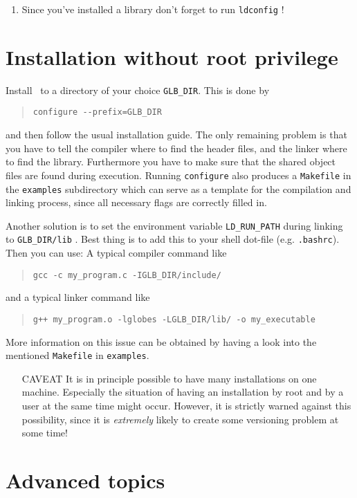 \begin{appendix}
\begin{enumerate}
\item Since you've installed a library don't forget to run \verb+ldconfig+ !
\end{enumerate}
\section*{Installation without root privilege}

Install \GLOBES\ to a directory of your choice \verb+GLB_DIR+. This is done by
\begin{quote}
\verb+configure --prefix=GLB_DIR+
\end{quote}
and then follow the usual installation guide. The only remaining problem
is that you have to tell the compiler where to find the header files, and 
the linker where to find the library. Furthermore you have to make sure 
that the shared object files are found during execution. Running 
\verb+configure+
also produces a \verb+Makefile+ in the \verb+examples+ 
subdirectory which can serve as
a template for the compilation and linking process, since all necessary
flags are correctly filled in. 

Another solution is to set the environment variable \verb+LD_RUN_PATH+
during linking to \verb+GLB_DIR/lib+ . Best thing is to add this to your
shell dot-file (e.g. \verb+.bashrc+). Then you can use:
A typical compiler command like
\begin{quote}
\verb+gcc -c my_program.c -IGLB_DIR/include/+
\end{quote}
and a typical linker command like
\begin{quote}
\verb#g++ my_program.o -lglobes -LGLB_DIR/lib/ -o my_executable#
\end{quote}
More information on this issue can be obtained by having a look 
into the mentioned  \verb+Makefile+ in \verb+examples+. 

\begin{itemize}
\item[CAVEAT] It is in principle possible to have many installations 
on one machine. Especially the situation of having an installation by root and by a user at the same time might occur. However, it is strictly warned against this possibility, since it is \emph{extremely} likely to create some versioning problem at some time!
\end{itemize}

\section*{Advanced topics}


\end{appendix}
